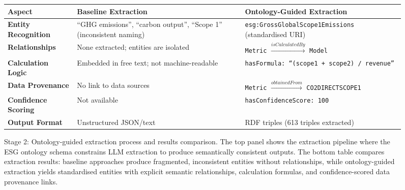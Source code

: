 \begin{figure}[t]
\renewcommand{\arraystretch}{1.2}
\begin{tabular}{p{3.5cm}|p{5.5cm}|p{5.5cm}}
\toprule
\textbf{Aspect} & \textbf{Baseline Extraction} & \textbf{Ontology-Guided Extraction} \\
\midrule
\textbf{Entity Recognition} &
\textcolor{red!70!black}{``GHG emissions'', ``carbon output'', ``Scope 1''} (inconsistent naming) &
\textcolor{green!50!black}{\texttt{esg:GrossGlobalScope1Emissions}} (standardised URI) \\
\midrule
\textbf{Relationships} &
\textcolor{red!70!black}{None extracted; entities are isolated} &
\textcolor{green!50!black}{\texttt{Metric} $\xrightarrow{isCalculatedBy}$ \texttt{Model}} \\
\midrule
\textbf{Calculation Logic} &
\textcolor{red!70!black}{Embedded in free text; not machine-readable} &
\textcolor{green!50!black}{\texttt{hasFormula: ``(scope1 + scope2) / revenue''}} \\
\midrule
\textbf{Data Provenance} &
\textcolor{red!70!black}{No link to data sources} &
\textcolor{green!50!black}{\texttt{Metric} $\xrightarrow{obtainedFrom}$ \texttt{CO2DIRECTSCOPE1}} \\
\midrule
\textbf{Confidence Scoring} &
\textcolor{red!70!black}{Not available} &
\textcolor{green!50!black}{\texttt{hasConfidenceScore: 100}} \\
\midrule
\textbf{Output Format} &
\textcolor{red!70!black}{Unstructured JSON/text} &
\textcolor{green!50!black}{RDF triples (613 triples extracted)} \\
\bottomrule
\end{tabular}

\caption{Stage 2: Ontology-guided extraction process and results comparison. The top panel shows the extraction pipeline where the ESG ontology schema constrains LLM extraction to produce semantically consistent outputs. The bottom table compares extraction results: baseline approaches produce fragmented, inconsistent entities without relationships, while ontology-guided extraction yields standardised entities with explicit semantic relationships, calculation formulas, and confidence-scored data provenance links.}
\label{fig:stage2_extraction}
\end{figure}
